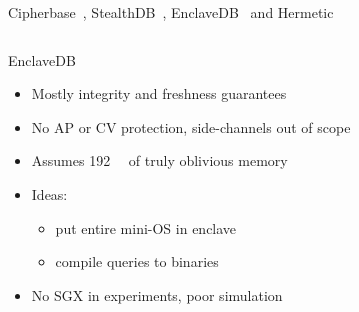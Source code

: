 \begin{frame}{Cipherbase~\cite{cipherbase}, StealthDB~\cite{stealth-db}, EnclaveDB~\cite{enclave-db} and Hermetic~\cite{hermetic}}
\begin{columns}[T,onlytextwidth]
{\begin{block}{EnclaveDB~\cite{enclave-db}}
							\begin{itemize}
								\item Mostly integrity and freshness guarantees
								\item No AP or CV protection, side-channels out of scope
								\item \alert{Assumes \SI{192}{\giga\byte} of truly oblivious memory}
								\item Ideas:
									\begin{itemize}
										\item put entire mini-OS in enclave
										\item compile queries to binaries
									\end{itemize}
								\item No SGX in experiments, poor simulation
							\end{itemize}

						\end{block}

					}



			\end{columns}

		\end{frame}

